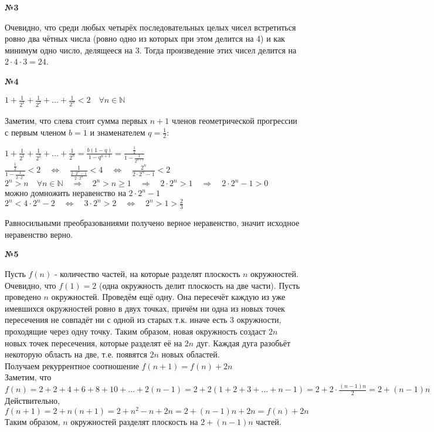 \documentclass{article}
\newenvironment{task}{\begin{center}\fontsize{14}{14}\selectfont\bf}{\rm\fontsize{12}{12}\selectfont\end{center}}
\begin{document}
	\begin{task} 
		№3
	\end{task}
	Очевидно, что среди любых четырёх последовательных целых чисел встретиться ровно два чётных числа (ровно одно из которых при этом делится на 4) и как минимум одно число, делящееся на 3. Тогда произведение этих чисел делится на $2\cdot4\cdot3=24$. \\


	\begin{task} 
		№4
	\end{task}
	\begin{center}
		$1 + \frac{1}{2^1} + \frac{1}{2^2} + \dots + \frac{1}{2^n} < 2 \quad \forall n \in \mathbb{N}$
	\end{center}
	Заметим, что слева стоит сумма первых $n+1$ членов геометрической прогрессии с первым членом $b = 1$ и знаменателем $q=\frac{1}{2}$:
	\begin{center}
		$1 + \frac{1}{2^1} + \frac{1}{2^2} + \dots + \frac{1}{2^n} = \frac{b(1-q)}{1 - q^{n+1}} = \frac{\frac{1}{2}}{1 - \frac{1}{2^{n+1}}}$\\
		$\frac{\frac{1}{2}}{1 - \frac{1}{2\cdot2^n}} < 2		
		\quad\Leftrightarrow\quad
		\frac{1}{\frac{2\cdot2^n - 1}{2\cdot2^n}} < 4
		\quad\Leftrightarrow\quad
		\frac{2^n}{2\cdot2^n - 1} < 2$ \\
		$2^n > n \quad\forall n \in \mathbb{N} \quad\Rightarrow\quad 2^n > n \geq 1 \quad\Rightarrow\quad 2\cdot 2^n > 1 \quad\Rightarrow\quad 2\cdot2^n-1 > 0$\\
		можно домножить неравенство на $2\cdot2^n-1$\\
		$2^n < 4\cdot2^n - 2
		\quad\Leftrightarrow\quad
		3\cdot 2^n > 2
		\quad\Leftrightarrow\quad
		2^n > 1 > \frac{2}{3}$ 
	\end{center}
	Равносильными преобразованиями получено верное неравенство, значит исходное неравенство верно.

	\begin{task} 
		№5
	\end{task}
	Пусть $f(n)$ - количество частей, на которые разделят плоскость $n$ окружностей.\\
	Очевидно, что $f(1) = 2$ (одна окружность делит плоскость на две части). Пусть проведено $n$ окружностей. Проведём ещё одну. Она пересечёт каждую из уже имевшихся окружностей ровно в двух точках, причём ни одна из новых точек пересечения не совпадёт ни с одной из старых т.к. иначе есть 3 окружности, проходящие через одну точку. Таким образом, новая окружность создаст $2n$ новых точек пересечения, которые разделят её на $2n$ дуг. Каждая дуга разобьёт некоторую область на две, т.е. появятся $2n$ новых областей. \\
	Получаем рекуррентное соотношение $f(n+1) = f(n) + 2n$ \\
	Заметим, что $f(n) = 2 + 2 + 4 + 6 + 8 + 10 + \dots + 2(n-1) 
	= 2 + 2(1 + 2 + 3 + \dots + n-1) 
	= 2 + 2\cdot \frac{(n-1)n}{2} = 2 + (n-1)n$
	Действительно, $f(n+1) = 2 + n(n+1) = 2 + n^2 - n + 2n = 2 + (n-1)n + 2n = f(n) + 2n$  \\
	Таким образом, $n$ окружностей разделят плоскость на $2 + (n-1)n$ частей.
\end{document}
